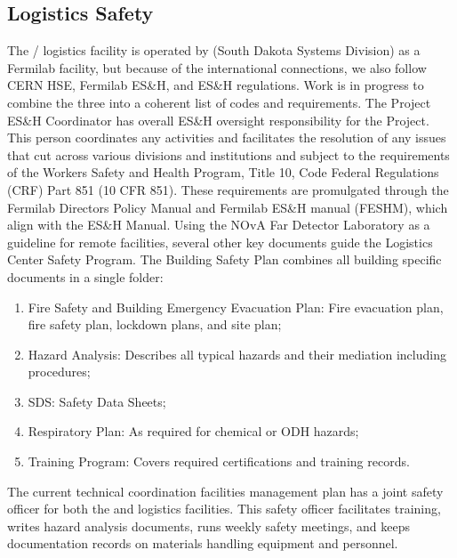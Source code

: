 \subsection{Logistics Safety}
\label{sec:fdsp-tc-log-safety}

The / logistics facility is operated by  (South Dakota Systems Division) 
as a Fermilab facility, but because of the international connections, we also follow CERN HSE, Fermilab ES\&H, and  ES\&H regulations.  Work is in progress to combine the three into a coherent list of codes and requirements. The  Project ES\&H Coordinator has overall ES\&H oversight responsibility for the  Project.  This person coordinates any activities and facilitates the resolution of any issues that cut across various divisions and institutions and subject to the requirements of the  Workers Safety and Health Program, Title 10, Code Federal Regulations (CRF) Part 851 (10 CFR 851). These requirements are promulgated through the Fermilab Directors Policy Manual and Fermilab ES\&H manual (FESHM), which align with the  ES\&H Manual. 
Using the NOvA Far Detector Laboratory as a guideline for remote facilities, several other key documents guide the Logistics Center Safety Program.  The Building Safety Plan combines all building specific documents in a single folder:

\begin{enumerate}
\item	Fire Safety and Building Emergency Evacuation Plan: Fire evacuation plan, fire safety plan,  lockdown plans, and site plan;
\item	Hazard Analysis: Describes all typical hazards and their mediation including procedures; 
\item	SDS: Safety Data Sheets;
\item	Respiratory Plan: As required for chemical or ODH hazards;
\item	Training Program: Covers required certifications and  training records.
\end{enumerate}

The current technical coordination facilities management plan has a joint safety officer for both the  and logistics facilities. This safety officer facilitates training, writes hazard analysis documents, runs weekly safety meetings, and keeps documentation records on materials handling equipment and personnel. 




